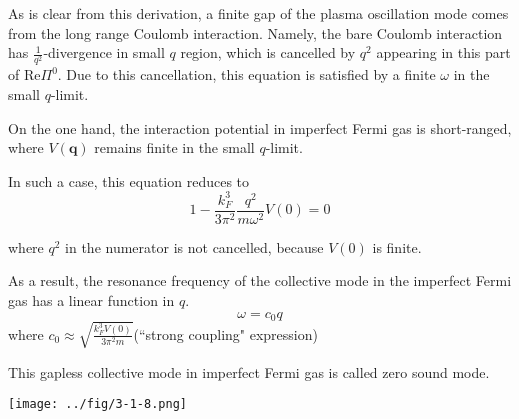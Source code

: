 As is clear from this derivation, a finite gap of the plasma oscillation mode comes from the long range Coulomb interaction. Namely, the bare Coulomb interaction has $\frac{1}{q^2}$-divergence in small $q$ region, which is cancelled by $q^2$ appearing in this part of $\text{Re} \Pi^0$. Due to this cancellation, this equation is satisfied by a finite $\omega$ in the small $q$-limit.

On the one hand, the interaction potential in imperfect Fermi gas is short-ranged, where $V(\mathbf{q})$ remains finite in the small $q$-limit.

In such a case, this equation reduces to
\begin{equation} \label{Eqs3.2.14}
1 - \frac{k_F^3}{3\pi^2} \frac{q^2}{m\omega^2} V(0) = 0
\end{equation}

where $q^2$ in the numerator is not cancelled, because $V(0)$ is finite.

As a result, the resonance frequency of the collective mode in the imperfect Fermi gas has a linear function in $q$.
\begin{equation} \label{Eqs3.2.15}
\omega = c_0 q
\end{equation}
where $c_0 \approx \sqrt{\frac{k_F^3V(0)}{3\pi^2 m}}$(``strong coupling" expression)

This gapless collective mode in imperfect Fermi gas is called zero sound mode.

\begin{center} \label{Fig3.1.8}
\texttt{[image: ../fig/3-1-8.png]}
\end{center}
